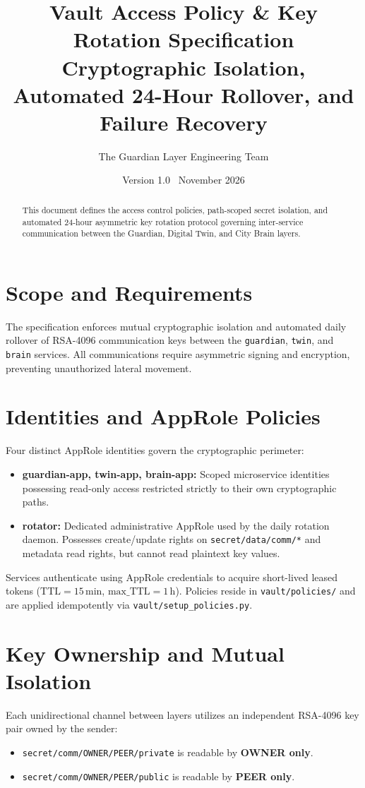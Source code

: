 \documentclass[11pt,a4paper]{article}
\title{\sffamily\bfseries\huge Vault Access Policy \& Key Rotation Specification\\[0.3em]
\Large Cryptographic Isolation, Automated 24-Hour Rollover, and Failure Recovery}
\author{\textsf{The Guardian Layer Engineering Team}}
\date{\textsf{Version 1.0 \textbar\ November 2026}}
\begin{document}
\maketitle
\thispagestyle{fancy}

\begin{abstract}
\noindent This document defines the access control policies, path-scoped secret isolation, and automated 24-hour asymmetric key rotation protocol governing inter-service communication between the Guardian, Digital Twin, and City Brain layers.
\end{abstract}

\vspace{0.3cm}

\section{Scope and Requirements}
The specification enforces mutual cryptographic isolation and automated daily rollover of RSA-4096 communication keys between the \texttt{guardian}, \texttt{twin}, and \texttt{brain} services. All communications require asymmetric signing and encryption, preventing unauthorized lateral movement.

\section{Identities and AppRole Policies}
Four distinct AppRole identities govern the cryptographic perimeter:
\begin{itemize}[leftmargin=*,itemsep=2pt]
  \item \textbf{guardian-app, twin-app, brain-app:} Scoped microservice identities possessing read-only access restricted strictly to their own cryptographic paths.
  \item \textbf{rotator:} Dedicated administrative AppRole used by the daily rotation daemon. Possesses create/update rights on \texttt{secret/data/comm/*} and metadata read rights, but cannot read plaintext key values.
\end{itemize}
Services authenticate using AppRole credentials to acquire short-lived leased tokens ($\text{TTL} = 15$\,min, $\text{max\_TTL} = 1$\,h). Policies reside in \texttt{vault/policies/} and are applied idempotently via \texttt{vault/setup\_policies.py}.

\section{Key Ownership and Mutual Isolation}
Each unidirectional channel between layers utilizes an independent RSA-4096 key pair owned by the sender:
\begin{itemize}[leftmargin=*,itemsep=2pt]
  \item \texttt{secret/comm/OWNER/PEER/private} is readable by \textbf{OWNER only}.
  \item \texttt{secret/comm/OWNER/PEER/public} is readable by \textbf{PEER only}.
\end{itemize}
\end{document}
